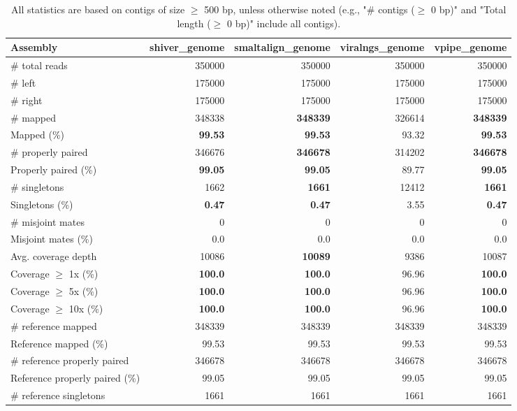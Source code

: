 \documentclass[12pt,a4paper]{article}
\begin{document}
\begin{table}[ht]
\begin{center}
\caption{All statistics are based on contigs of size $\geq$ 500 bp, unless otherwise noted (e.g., "\# contigs ($\geq$ 0 bp)" and "Total length ($\geq$ 0 bp)" include all contigs).}
\begin{tabular}{|l*{4}{|r}|}
\hline
Assembly & shiver\_genome & smaltalign\_genome & viralngs\_genome & vpipe\_genome \\ \hline
\# total reads & 350000 & 350000 & 350000 & 350000 \\ \hline
\# left & 175000 & 175000 & 175000 & 175000 \\ \hline
\# right & 175000 & 175000 & 175000 & 175000 \\ \hline
\# mapped & 348338 & {\bf 348339} & 326614 & {\bf 348339} \\ \hline
Mapped (\%) & {\bf 99.53} & {\bf 99.53} & 93.32 & {\bf 99.53} \\ \hline
\# properly paired & 346676 & {\bf 346678} & 314202 & {\bf 346678} \\ \hline
Properly paired (\%) & {\bf 99.05} & {\bf 99.05} & 89.77 & {\bf 99.05} \\ \hline
\# singletons & 1662 & {\bf 1661} & 12412 & {\bf 1661} \\ \hline
Singletons (\%) & {\bf 0.47} & {\bf 0.47} & 3.55 & {\bf 0.47} \\ \hline
\# misjoint mates & 0 & 0 & 0 & 0 \\ \hline
Misjoint mates (\%) & 0.0 & 0.0 & 0.0 & 0.0 \\ \hline
Avg. coverage depth & 10086 & {\bf 10089} & 9386 & 10087 \\ \hline
Coverage $\geq$ 1x (\%) & {\bf 100.0} & {\bf 100.0} & 96.96 & {\bf 100.0} \\ \hline
Coverage $\geq$ 5x (\%) & {\bf 100.0} & {\bf 100.0} & 96.96 & {\bf 100.0} \\ \hline
Coverage $\geq$ 10x (\%) & {\bf 100.0} & {\bf 100.0} & 96.96 & {\bf 100.0} \\ \hline
\# reference mapped & 348339 & 348339 & 348339 & 348339 \\ \hline
Reference mapped (\%) & 99.53 & 99.53 & 99.53 & 99.53 \\ \hline
\# reference properly paired & 346678 & 346678 & 346678 & 346678 \\ \hline
Reference properly paired (\%) & 99.05 & 99.05 & 99.05 & 99.05 \\ \hline
\# reference singletons & 1661 & 1661 & 1661 & 1661 \\ \hline

\end{tabular}
\end{center}
\end{table}
\end{document}
